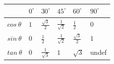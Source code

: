 \begin{table}[H]
\begin{center}
\setlength{\extrarowheight}{2.5pt}

\begin{tabular}{|m{1.2cm}|l|l|l|l|l|}\hline
&
${0}^{\circ }$
&
${30}^{\circ }$
&
${45}^{\circ }$
&
${60}^{\circ }$
&
${90}^{\circ }$



\\ \hline
$cos~\theta $
 &
$1$
&
$\frac{\sqrt{3}}{2}$
&
$\frac{1}{\sqrt{2}}$
&
$\frac{1}{2}$
&
$0$


\\ \hline
$sin~\theta $
&
$0$
&
$\frac{1}{2} $
&
$\frac{1}{\sqrt{2}}$
&
$\frac{\sqrt{3}}{2}$
&
$1$

\\ \hline
$tan~\theta $
&
$0$
&
$\frac{1}{\sqrt{3}}$
&
$1$ &
$\sqrt{3}$
&
undef


\\ \hline
\end{tabular}
\end{center}
\end{table}



